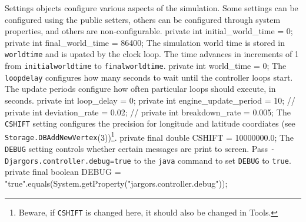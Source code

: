  Settings objects configure various aspects of the simulation.
Some settings can be configured using the public setters, others can
be configured through system properties, and others are non-configurable.
\nwenddocs{}\endmoddef{}
private int initial_world_time = 0;
private int final_world_time = 86400;
\nwendcode{}\nwdocspar
The simulation world time is stored in {\tt{}world{}time} and is upated by the
clock loop. The time advances in increments of 1 from {\tt{}initial{}world{}time}
to {\tt{}final{}world{}time}.
\nwenddocs{}\plusendmoddef
private int world_time = 0;
\nwendcode{}\nwdocspar
The {\tt{}loop{}delay} configures how many seconds to wait until the controller
loops start. The update periods configure how often particular loops should
execute, in seconds.
\nwenddocs{}\plusendmoddef
private int loop_delay = 0;
private int engine_update_period = 10;
// private int deviation_rate = 0.02;
// private int breakdown_rate = 0.005;
\nwendcode{}\nwdocspar
The {\tt{}CSHIFT} setting configures the precision for longitude and latitude
coordiates (see {\tt{}Storage.\protect{}DBAddNewVertex}(3))\footnote{Beware, if {\tt{}CSHIFT}
is changed here, it should also be changed in Tools.}.
\nwenddocs{}\plusendmoddef
private final double CSHIFT = 10000000.0;
\nwendcode{}\nwdocspar
The {\tt{}DEBUG} setting controls whether certain messages are print to screen.
Pass {\tt{}-Djargors.controller.debug=true} to the {\tt{}java} command to set
{\tt{}DEBUG} to {\tt{}true}.
\nwenddocs{}\plusendmoddef
private final boolean DEBUG = "true".equals(System.getProperty("jargors.controller.debug"));
\nwendcode{}\nwdocspar

